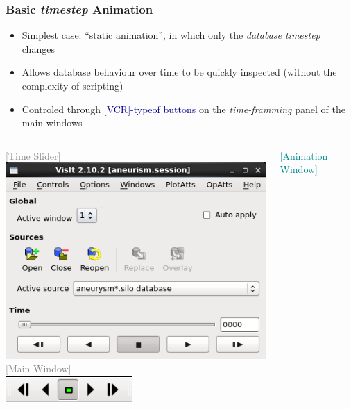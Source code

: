 \begin{frame}
\frametitle{Basic \textit{timestep} Animation}
\vspace{-2.5mm}
\begin{itemize}
	\item Simplest case: ``static animation'', in which only the \textit{database timestep} changes
	\item Allows database behaviour over time to be quickly inspected (without the complexity of scripting)
	\item Controled through \textcolor{DarkBlue}{[VCR]-typeof buttons} on the \textit{time-framming} panel of the main windows
\end{itemize}

\vspace{.5mm}
\begin{columns}
\begin{column}{4.75cm}
	\pause
	\centering
	\textcolor{gray}{\small [Time Slider]}	\\
	\includegraphics[width=\columnwidth]{figs/visit-guis/visit_VCR}
	\\
	\textcolor{gray}{\small [Main Window]}	\\
	\includegraphics[width=.45\columnwidth]{figs/visit-guis/visit_VCRmenu}
\end{column}
\begin{column}{4cm}
	\pause
	\centering
	\textcolor{DarkCyan}{\small [Animation Window]}	\\

\end{column}
\end{columns}
\end{frame}
